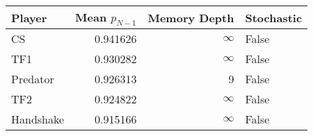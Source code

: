 \begin{tabular}{lrrl}
\toprule
    Player &  Mean $p_{N-1}$ &  Memory Depth & Stochastic \\
\midrule
        CS &        0.941626 &            \(\infty\) &      False \\
       TF1 &        0.930282 &            \(\infty\) &      False \\
  Predator &        0.926313 &             9 &      False \\
       TF2 &        0.924822 &            \(\infty\) &      False \\
 Handshake &        0.915166 &            \(\infty\) &      False \\
\bottomrule
\end{tabular}
